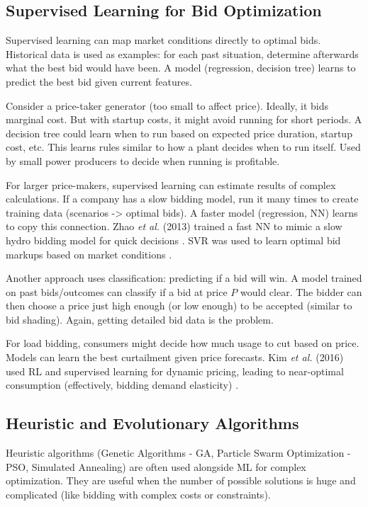 \documentclass[conference]{IEEEtran}
\begin{document}
\subsection{Supervised Learning for Bid Optimization}

Supervised learning can map market conditions directly to optimal bids. Historical data is used as examples: for each past situation, determine afterwards what the best bid would have been. A model (regression, decision tree) learns to predict the best bid given current features.

Consider a price-taker generator (too small to affect price). Ideally, it bids marginal cost. But with startup costs, it might avoid running for short periods. A decision tree could learn when to run based on expected price duration, startup cost, etc. This learns rules similar to how a plant decides when to run itself. Used by small power producers to decide when running is profitable.

For larger price-makers, supervised learning can estimate results of complex calculations. If a company has a slow bidding model, run it many times to create training data (scenarios -> optimal bids). A faster model (regression, NN) learns to copy this connection. Zhao \textit{et al.} (2013) trained a fast NN to mimic a slow hydro bidding model for quick decisions \cite{Zhao2013}. SVR was used to learn optimal bid markups based on market conditions \cite{Schnieder2006}.

Another approach uses classification: predicting if a bid will win. A model trained on past bids/outcomes can classify if a bid at price $P$ would clear. The bidder can then choose a price just high enough (or low enough) to be accepted (similar to bid shading). Again, getting detailed bid data is the problem.

For load bidding, consumers might decide how much usage to cut based on price. Models can learn the best curtailment given price forecasts. Kim \textit{et al.} (2016) used RL and supervised learning for dynamic pricing, leading to near-optimal consumption (effectively, bidding demand elasticity) \cite{Kim2016}.

\subsection{Heuristic and Evolutionary Algorithms}

Heuristic algorithms (Genetic Algorithms - GA, Particle Swarm Optimization - PSO, Simulated Annealing) are often used alongside ML for complex optimization. They are useful when the number of possible solutions is huge and complicated (like bidding with complex costs or constraints).
\end{document}
